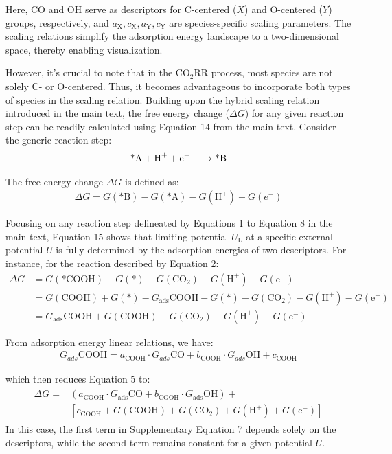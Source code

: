 Here, CO and OH serve as descriptors for C-centered ($X$) and O-centered ($Y$) groups, respectively, and $a_{\mathrm{X}}, c_{\mathrm{X}}, a_{\mathrm{Y}}, c_{\mathrm{Y}}$ are species-specific scaling parameters.
The scaling relations simplify the adsorption energy landscape to a two-dimensional space, thereby enabling visualization.

However, it's crucial to note that in the CO$_2$RR process, most species are not solely C- or O-centered.
Thus, it becomes advantageous to incorporate both types of species in the scaling relation.
Building upon the hybrid scaling relation introduced in the main text, the free energy change ($\Delta\mathit{G}$) for any given reaction step can be readily calculated using Equation 14 from the main text.
Consider the generic reaction step:
\begin{align}
  \ce{\text{*}A + H+ + e- -> \text{*}B}
\end{align}

The free energy change $\Delta\mathit{G}$ is defined as:
\begin{align}
  \Delta G = G(\text{*}\mathrm{B}) - G(\text{*}\mathrm{A}) - G(\mathrm{H}^+) - G(e^-)
\end{align}

Focusing on any reaction step delineated by Equations 1 to Equation 8 in the main text,
Equation 15 shows that limiting potential $U_{\mathrm{L}}$ at a specific external potential $U$ is fully determined by the adsorption energies of two descriptors.
For instance, for the reaction described by Equation 2:
\begin{align}
  \Delta G &= G(\text{*COOH}) - G(\text{*}) - G(\text{CO}_2) - G(\text{H}^+) - G(\text{e}^-) \\
  &= G(\text{COOH}) + G(\text{*}) - G_{\text{ads}}\text{COOH} - G(\text{*}) - G(\text{CO}_2) -G(\text{H}^+) - G(\text{e}^-) \\
  &= G_{\text{ads}}\text{COOH} + G(\text{COOH}) - G(\text{CO}_2) -G(\text{H}^+) - G(\text{e}^-)
\end{align}

From adsorption energy linear relations, we have:
\begin{align}
  G_{ads}{\mathrm{COOH}} = a_{\text{COOH}} \cdot G_{ads}{\mathrm{CO}} + b_{\text{COOH}} \cdot G_{ads}{\mathrm{OH}} + c_{\text{COOH}}
\end{align}

which then reduces Equation 5 to:
\begin{align}
  \begin{split}
    \Delta G = &(a_{\text{COOH}} \cdot G_{\text{ads}}{\mathrm{CO}} + b_{\text{COOH}} \cdot G_{\text{ads}}{\mathrm{OH}}) + \\
    &[c_{\text{COOH}} + G(\mathrm{COOH}) + G(\mathrm{CO}_2) + G(\mathrm{H}^+) + G(\mathrm{e}^-)]
  \end{split}
\end{align}
In this case, the first term in Supplementary Equation 7 depends solely on the descriptors, while the second term remains constant for a given potential $U$.


